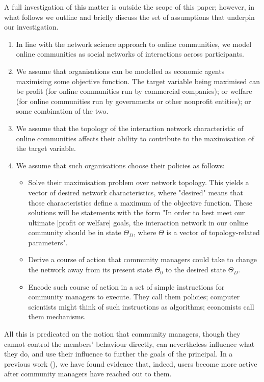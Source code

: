 A full investigation of this matter is outside the scope of this paper; however, in what follows we outline and briefly discuss the set of assumptions that underpin our investigation. 

\begin{enumerate}
\item In line with the network science approach to online communities, we model online communities as social networks of interactions across participants. 
\item We assume that organisations can be modelled as economic agents maximising some objective function. The target variable being maximised can be profit (for online communities run by commercial companies); or welfare (for online communities run by governments or other nonprofit entities); or some combination of the two. 
\item We assume that the topology of the interaction network characteristic of online communities affects their ability to contribute to the maximisation of the target variable. 
\item We assume that such organisations choose their policies as follows: 
\begin{itemize} 
	\item Solve their maximisation problem over network topology. This yields a vector of desired network characteristics, where "desired" means that those characteristics define a maximum of the objective function. These solutions will be statements with the form "In order to best meet our ultimate [profit or welfare] goals, the interaction network in our online community should be in state $\Theta_D$, where $\Theta$ is a vector of topology-related parameters".
	\item Derive a course of action that community managers could take to change the network away from its present state $\Theta_0$ to the desired state $\Theta_D$.
	\item Encode such course of action in a set of simple instructions for community managers to execute. They call them policies; computer scientists might think of such instructions as algorithms; economists call them mechanisms. 
\end{itemize}
\end{enumerate}

 All this is predicated on the notion that community managers, though they cannot control the members' behaviour directly, can nevertheless influence what they do, and use their influence to further the goals of the principal. In a previous work (\cite{cottica2016microfoundations}), we have found evidence that, indeed, users become more active after community managers have reached out to them.
 
